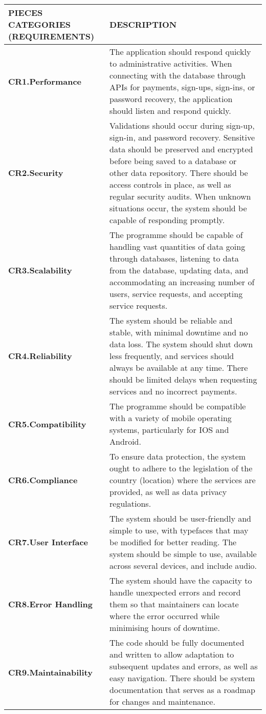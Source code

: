 \documentclass[9pt]{report}
\begin{document}
\begin{tabular}{ |p{4cm}|p{12cm}| }
 \hline
 \rowcolor{lightgray} \textbf{PIECES CATEGORIES (REQUIREMENTS)} & \textbf{DESCRIPTION}\\
 \hline
 \textbf{CR1.Performance}   & The application should respond quickly to administrative activities. When connecting with the database through APIs for payments, sign-ups, sign-ins, or password recovery, the application should listen and respond quickly.\\
  \hline
 \textbf{CR2.Security} &   Validations should occur during sign-up, sign-in, and password recovery. Sensitive data should be preserved and encrypted before being saved to a database or other data repository. There should be access controls in place, as well as regular security audits. When unknown situations occur, the system should be capable of responding promptly. \\
  \hline
 \textbf{CR3.Scalability} & The programme should be capable of handling vast quantities of data going through databases, listening to data from the database, updating data, and accommodating an increasing number of users, service requests, and accepting service requests.\\
 \hline
 \textbf{CR4.Reliability} &The system should be reliable and stable, with minimal downtime and no data loss. The system should shut down less frequently, and services should always be available at any time. There should be limited delays when requesting services and no incorrect payments.\\
 \hline
 \textbf{CR5.Compatibility}&   The programme should be compatible with a variety of mobile operating systems, particularly for IOS and Android.\\
 \hline
 \textbf{CR6.Compliance}& To ensure data protection, the system ought to adhere to the legislation of the country (location) where the services are provided, as well as data privacy regulations.\\
 \hline
 \textbf{CR7.User Interface}& The system should be user-friendly and simple to use, with typefaces that may be modified for better reading. The system should be simple to use, available across several devices, and include audio.
\\
 \hline
 \textbf{CR8.Error Handling}& The system should have the capacity to handle unexpected errors and record them so that maintainers can locate where the error occurred while minimising hours of downtime.
\\
 \hline
 \textbf{CR9.Maintainability}& The code should be fully documented and written to allow adaptation to subsequent updates and errors, as well as easy navigation. There should be system documentation that serves as a roadmap for changes and maintenance.
\\
 \hline
 
\end{tabular}
\end{document}
